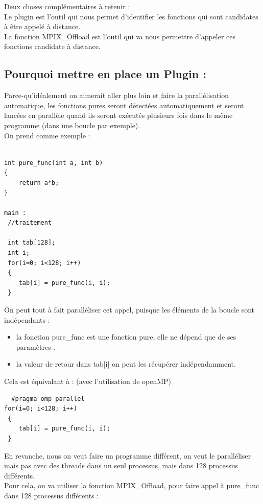 \documentclass[12pt,titlepage]{article}
\begin{document}
Deux choses complémentaires à retenir :\\
Le plugin est l'outil qui nous permet d'identifier les fonctions qui sont candidates à être appelé à distance.\\
La fonction MPIX\_Offload est l'outil qui va nous permettre d'appeler ces fonctions candidate à distance.

\subsection{Pourquoi mettre en place un Plugin :}

Parce-qu'idéalement on aimerait aller plus loin et faire la parallélisation automatique, les fonctions pures seront détectées automatiquement et seront lancées en parallèle quand ils seront exécutés plusieurs fois dans le même programme (dans une boucle par exemple).\\

On prend comme exemple :\\
\begin{lstlisting}

int pure_func(int a, int b)
{
    return a*b;
}

main : 
 //traitement 

 int tab[128];
 int i;
 for(i=0; i<128; i++)
 {
 	tab[i] = pure_func(i, i);
 }
\end{lstlisting}

On peut tout à fait paralléliser cet appel, puisque les éléments de la boucle sont indépendants :
\begin{itemize}
    \item la fonction pure\_func est une fonction pure, elle ne dépend que de ses paramètres .
 \item la valeur de retour dans tab[i] on peut les récupérer indépendamment.
\end{itemize}
Cela est équivalant à : (avec l'utilisation de openMP) \\
\begin{lstlisting}
  #pragma omp parallel  
for(i=0; i<128; i++) 
 { 
 	tab[i] = pure_func(i, i); 
 }
\end{lstlisting}

En revanche, nous on veut faire un programme différent, on veut le paralléliser mais pas avec des  threads dans un seul processus, mais dans 128 processus différents. \\
Pour cela, on va utiliser la fonction MPIX\_Offload, pour faire appel à pure\_func dans 128 processus différents :
\end{document}
